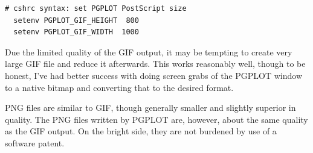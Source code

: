 {}
\begin{verbatim}
# cshrc syntax: set PGPLOT PostScript size
  setenv PGPLOT_GIF_HEIGHT  800
  setenv PGPLOT_GIF_WIDTH  1000
\end{verbatim}
\noindent
Due the limited quality of the GIF output, it may be tempting to create
very large GIF file and reduce it afterwards.  This works reasonably well,
though to be honest, I've had better success with doing screen grabs of the
PGPLOT window to a native bitmap and converting that to the desired format.

{} PNG files are similar to GIF, though
generally smaller and slightly superior in quality.  The PNG files written
by PGPLOT are, however, about the same quality as the GIF output.  On the
bright side, they are not burdened by use of a software patent.

